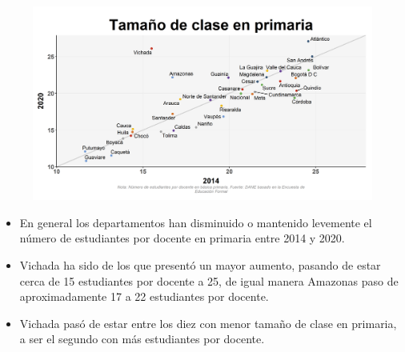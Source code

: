     \begin{figure}[H]
        \caption[Tamaño de clase en primaria por departamentos - 2010 VS 2020 ]{\label{tamano_primaria_dpto_scatter} }
        \begin{center}
        \includegraphics[width=\textwidth,keepaspectratio]{img/var_228_scatter_time.png}
        \end{center}
    \end{figure}
            \begin{itemize}
                \item En general los departamentos han disminuido o mantenido levemente el número de estudiantes por docente en primaria entre 2014 y 2020.
                \item Vichada ha sido de los que presentó un mayor aumento, pasando de estar cerca de 15 estudiantes por docente a 25, de igual manera Amazonas paso de aproximadamente 17 a 22 estudiantes por docente.
                \item Vichada pasó de estar entre los diez con menor tamaño de clase en primaria, a ser el segundo con más estudiantes por docente.
                \end{itemize}

